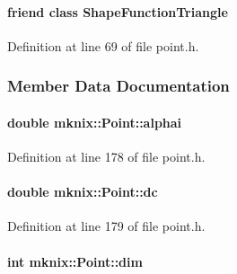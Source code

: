 \paragraph[{Shape\+Function\+Triangle}]{\setlength{\rightskip}{0pt plus 5cm}friend class {\bf Shape\+Function\+Triangle}\hspace{0.3cm}{\ttfamily [friend]}}\label{classmknix_1_1_point_a64bc125443b7c740a25d032c8294c4db}


Definition at line 69 of file point.\+h.



\subsubsection{Member Data Documentation}
\hypertarget{classmknix_1_1_point_afbd74e8b9e7081984e5b03d802f7ae14}{}
\paragraph[{alphai}]{\setlength{\rightskip}{0pt plus 5cm}double mknix\+::\+Point\+::alphai\hspace{0.3cm}{\ttfamily [protected]}}\label{classmknix_1_1_point_afbd74e8b9e7081984e5b03d802f7ae14}


Definition at line 178 of file point.\+h.

\hypertarget{classmknix_1_1_point_a310b40e3859627d344de048bbdb1db6f}{}
\paragraph[{dc}]{\setlength{\rightskip}{0pt plus 5cm}double mknix\+::\+Point\+::dc\hspace{0.3cm}{\ttfamily [protected]}}\label{classmknix_1_1_point_a310b40e3859627d344de048bbdb1db6f}


Definition at line 179 of file point.\+h.

\hypertarget{classmknix_1_1_point_ab97e4bca7f299237ff3f8cc2449b1be1}{}
\paragraph[{dim}]{\setlength{\rightskip}{0pt plus 5cm}int mknix\+::\+Point\+::dim\hspace{0.3cm}{\ttfamily [protected]}}\label{classmknix_1_1_point_ab97e4bca7f299237ff3f8cc2449b1be1}



